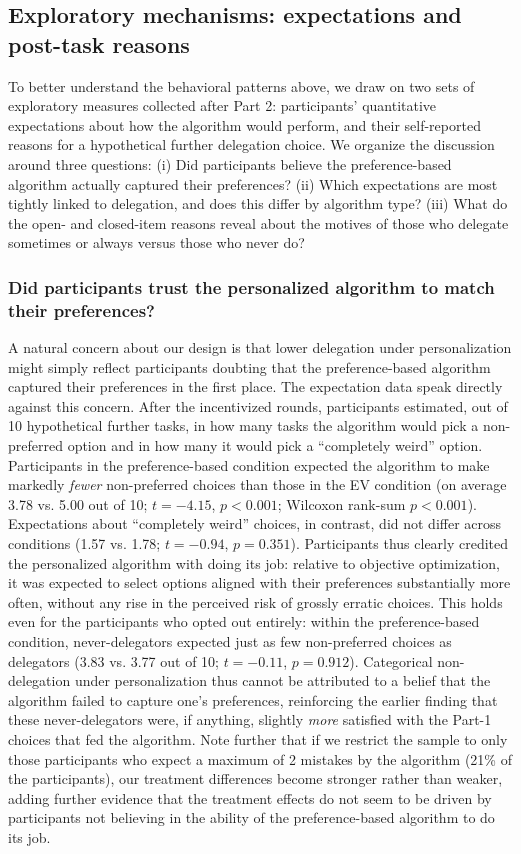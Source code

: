 \documentclass[a4paper, 12pt, fleqn]{article}
\theoremstyle{definition}
\begin{document}
\subsection{Exploratory mechanisms: expectations and post-task reasons}
\label{sec:exploratory_mechanisms}
To better understand the behavioral patterns above, we draw on two sets of exploratory measures collected after Part 2: participants' quantitative expectations about how the algorithm would perform, and their self-reported reasons for a hypothetical further delegation choice. We organize the discussion around three questions: (i) Did participants believe the preference-based algorithm actually captured their preferences? (ii) Which expectations are most tightly linked to delegation, and does this differ by algorithm type? (iii) What do the open- and closed-item reasons reveal about the motives of those who delegate sometimes or always versus those who never do?

\subsubsection*{Did participants trust the personalized algorithm to match their preferences?}
A natural concern about our design is that lower delegation under personalization might simply reflect participants doubting that the preference-based algorithm captured their preferences in the first place. The expectation data speak directly against this concern. After the incentivized rounds, participants estimated, out of 10 hypothetical further tasks, in how many tasks the algorithm would pick a non-preferred option and in how many it would pick a ``completely weird'' option. Participants in the preference-based condition expected the algorithm to make markedly \emph{fewer} non-preferred choices than those in the EV condition (on average 3.78 vs. 5.00 out of 10; $t = -4.15$, $p < 0.001$; Wilcoxon rank-sum $p < 0.001$). Expectations about ``completely weird'' choices, in contrast, did not differ across conditions (1.57 vs. 1.78; $t = -0.94$, $p = 0.351$). Participants thus clearly credited the personalized algorithm with doing its job: relative to objective optimization, it was expected to select options aligned with their preferences substantially more often, without any rise in the perceived risk of grossly erratic choices. This holds even for the participants who opted out entirely: within the preference-based condition, never-delegators expected just as few non-preferred choices as delegators (3.83 vs. 3.77 out of 10; $t = -0.11$, $p = 0.912$). Categorical non-delegation under personalization thus cannot be attributed to a belief that the algorithm failed to capture one's preferences, reinforcing the earlier finding that these never-delegators were, if anything, slightly \emph{more} satisfied with the Part-1 choices that fed the algorithm. Note further that if we restrict the sample to only those participants who expect a maximum of 2 mistakes by the algorithm (21\% of the participants), our treatment differences become stronger rather than weaker, adding further evidence that the treatment effects do not seem to be driven by participants not believing in the ability of the preference-based algorithm to do its job.
\end{document}
